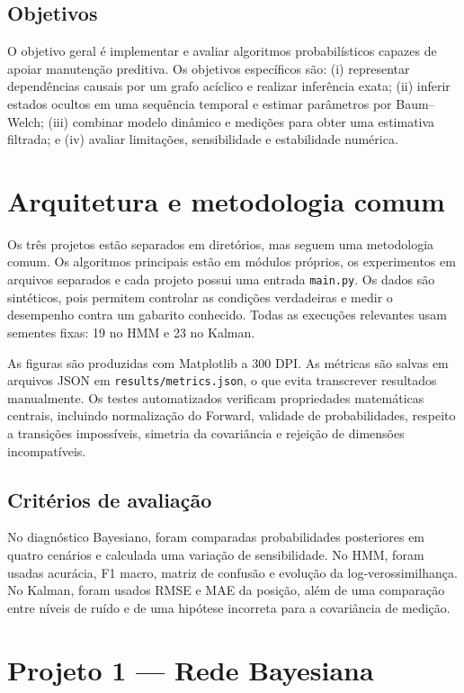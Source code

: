 \documentclass[11pt,a4paper]{article}
\begin{document}
\subsection{Objetivos}
O objetivo geral é implementar e avaliar algoritmos probabilísticos capazes de apoiar manutenção preditiva. Os objetivos específicos são: (i) representar dependências causais por um grafo acíclico e realizar inferência exata; (ii) inferir estados ocultos em uma sequência temporal e estimar parâmetros por Baum--Welch; (iii) combinar modelo dinâmico e medições para obter uma estimativa filtrada; e (iv) avaliar limitações, sensibilidade e estabilidade numérica.

\section{Arquitetura e metodologia comum}
Os três projetos estão separados em diretórios, mas seguem uma metodologia comum. Os algoritmos principais estão em módulos próprios, os experimentos em arquivos separados e cada projeto possui uma entrada \texttt{main.py}. Os dados são sintéticos, pois permitem controlar as condições verdadeiras e medir o desempenho contra um gabarito conhecido. Todas as execuções relevantes usam sementes fixas: 19 no HMM e 23 no Kalman.

As figuras são produzidas com Matplotlib a 300 DPI. As métricas são salvas em arquivos JSON em \texttt{results/metrics.json}, o que evita transcrever resultados manualmente. Os testes automatizados verificam propriedades matemáticas centrais, incluindo normalização do Forward, validade de probabilidades, respeito a transições impossíveis, simetria da covariância e rejeição de dimensões incompatíveis.

\subsection{Critérios de avaliação}
No diagnóstico Bayesiano, foram comparadas probabilidades posteriores em quatro cenários e calculada uma variação de sensibilidade. No HMM, foram usadas acurácia, F1 macro, matriz de confusão e evolução da log-verossimilhança. No Kalman, foram usados RMSE e MAE da posição, além de uma comparação entre níveis de ruído e de uma hipótese incorreta para a covariância de medição.

\section{Projeto 1 — Rede Bayesiana}
\end{document}
